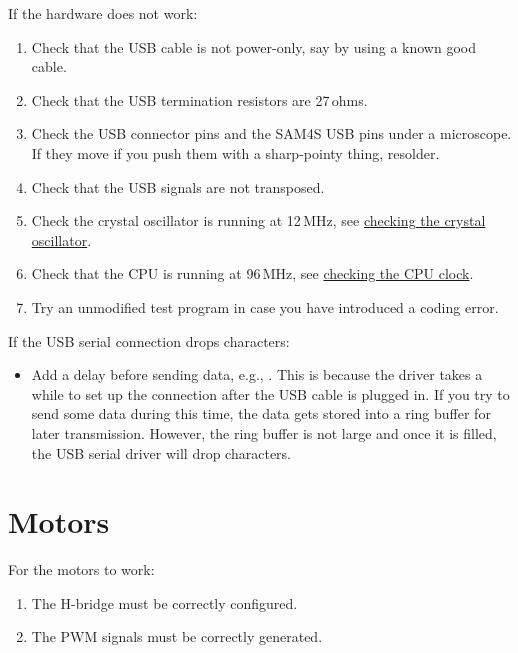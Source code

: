 If the hardware does not work:
%
\begin{enumerate}
  \item Check that the USB cable is not power-only, say by using a
    known good cable.

  \item
    Check that the USB termination resistors are 27\,ohms.

  \item Check the USB connector pins and the SAM4S USB pins under a
    microscope.  If they move if you push them with a sharp-pointy
    thing, resolder.

  \item
    Check that the USB signals are not transposed.

  \item Check the crystal oscillator is running at 12\,MHz, see
    \protect\hyperref[checking-the-crystal-oscillator]{checking the
      crystal oscillator}.

  \item Check that the CPU is running at 96\,MHz, see
    \protect\hyperref[checking-the-clock]{checking the CPU clock}.

  \item Try an unmodified test program in case you have introduced a
    coding error.
\end{enumerate}

If the USB serial connection drops characters:
 \begin{itemize}
 \item Add a delay before sending data, e.g., .
   This is because the driver takes a while to set up the connection
   after the USB cable is plugged in.  If you try to send some data
   during this time, the data gets stored into a ring buffer for later
   transmission.  However, the ring buffer is not large and once it is
   filled, the USB serial driver will drop characters.
 \end{itemize}


\section{Motors}
\label{motors-testing}

For the motors to work:
%
\begin{enumerate}
\item The H-bridge must be correctly configured.
\item The PWM signals must be correctly generated.
\end{enumerate}


